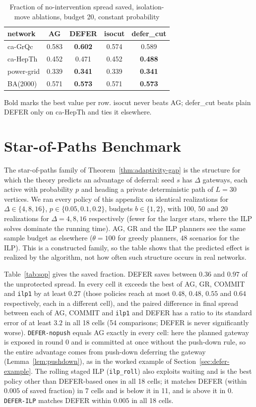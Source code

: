 \documentclass[ASNA,number]{USG}
\newcommand{\up}{\rule{0pt}{2.6ex}}
\newcommand{\down}{\rule[-1.2ex]{0pt}{0pt}}
\begin{document}
\begin{table}[h]
\centering
\caption{Fraction of no-intervention spread saved, isolation-move ablations, budget 20, constant probability\label{tab:isocut}}
\begin{tabular}{@{}lcccc@{}}
\hline
\up network & AG & DEFER & isocut & defer\_cut \\
\hline
\up ca-GrQc & 0.583 & \textbf{0.602} & 0.574 & 0.589 \\
ca-HepTh & 0.452 & 0.471 & 0.452 & \textbf{0.488} \\
power-grid & 0.339 & \textbf{0.341} & 0.339 & \textbf{0.341} \\
\down BA(2000) & 0.571 & \textbf{0.573} & 0.571 & \textbf{0.573} \\
\hline
\end{tabular}
Bold marks the best value per row. isocut never beats AG; defer\_cut
beats plain DEFER only on ca-HepTh and ties it elsewhere.
\end{table}

\section{Star-of-Paths Benchmark}\label{ec:sop}

The star-of-paths family of Theorem~\ref{thm:adaptivity-gap} is the structure
for which the theory predicts an advantage of deferral: seed $s$ has $\Delta$
gateways, each active with probability $p$ and heading a private deterministic
path of $L=30$ vertices. We ran every policy of this appendix on identical
realizations for $\Delta\in\{4,8,16\}$, $p\in\{0.05,0.1,0.2\}$, budgets
$b\in\{1,2\}$, with 100, 50 and 20 realizations for $\Delta=4,8,16$ respectively
(fewer for the larger stars, where the ILP solves dominate the running time).
AG, GR and the ILP planners see the same sample budget as elsewhere
($\theta=100$ for greedy planners, $48$ scenarios for the ILP). This is a
constructed family, so the table shows that the predicted effect is realized
by the algorithm, not how often such structure occurs in real networks.

Table~\ref{tab:sop} gives the saved fraction. DEFER saves between $0.36$ and
$0.97$ of the unprotected spread. In every cell it exceeds the best of AG, GR,
COMMIT and \texttt{ilp1} by at least $0.27$ (those policies reach at most $0.48$,
$0.48$, $0.55$ and $0.64$ respectively, each in a different cell), and the paired difference in
final spread between each of AG, COMMIT and \texttt{ilp1} and DEFER has a
ratio to its standard error of at least $3.2$ in all 18 cells (54 comparisons; DEFER
is never significantly worse). \texttt{DEFER-nopush} equals AG exactly in every
cell: here the planned gateway is exposed in round $0$ and is committed at once
without the push-down rule, so the entire advantage comes from push-down
deferring the gateway (Lemma~\ref{lem:pushdown}), as in the worked example of
Section~\ref{sec:defer-example}. The rolling staged ILP (\texttt{ilp\_roll})
also exploits waiting and is the best policy other than DEFER-based ones in all 18 cells;
it matches DEFER (within $0.005$ of saved fraction) in 7 cells and is below it in 11,
and is above it in 0. \texttt{DEFER-ILP} matches DEFER within $0.005$ in all 18 cells.
\end{document}

